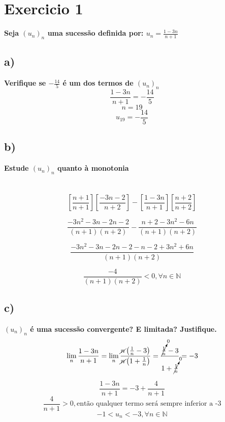 \documentclass[a4paper]{article}
\begin{document}
	 \section*{Exercicio 1} \textbf{Seja $\left(u_{n}\right)_{n}$ uma sucessão definida por: $u_{n}=\frac{1-3n}{n+1}$}
	 \subsection*{a)}
	  \textbf{Verifique se $-\frac{14}{5}$ é um dos termos de $\left(u_{n}\right)_{n}$}
	  \[\frac{1-3n}{n+1}=-\frac{14}{5}\]
	  \[n=19\]
	  \[u_{19}=-\frac{14}{5}\]
	  \subsection*{b)}
	  \textbf{Estude $\left(u_{n}\right)_{n}$ quanto à monotonia}\\
	  \\
	  \\
\[\left[\frac{n+1}{n+1}\right]\left[\frac{-3n-2}{n+2}\right] - \left[\frac{1-3n}{n+1}\right]\left[\frac{n+2}{n+2}\right] \]

\[\frac{-3n^2-3n-2n-2}{\left(n+1\right)\left(n+2\right)} - \frac{n+2-3n^2-6n}{\left(n+1\right)\left(n+2\right)}\]

\[\frac{-3n^2-3n-2n-2-n-2+3n^2+6n}{\left(n+1\right)\left(n+2\right)}\]

\[\frac{-4}{\left(n+1\right)\left(n+2\right)}<0, \forall n \in \mathbb{N}\]

\subsection*{c)}
\textbf{$\left(u_{n}\right)_{n}$ é uma sucessão convergente? E limitada? Justifique.}
\[\lim\limits_{n}\frac{1-3n}{n+1} =
\lim\limits_{n} \frac{\cancel{n}\left(\frac{1}{n}-3\right)}{\cancel{n}\left(1+ \frac{1}{n}\right)} = \frac{\cancelto{0}{\frac{1}{n}}-3}{1+ \cancelto{0}{\frac{1}{n}}} = -3\]


\[\frac{1-3n}{n+1} = -3 + \frac{4}{n+1}\]
\[\frac{4}{n+1} > 0, \text{então qualquer termo será sempre inferior a -3} \]
\[-1 < u_{n} < -3, \forall n \in \mathbb{N} \]
\end{document}
